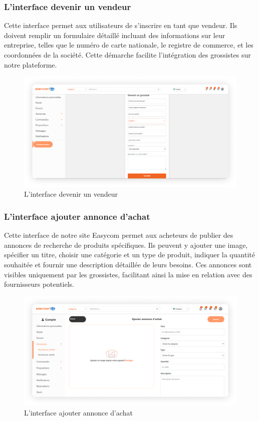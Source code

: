 \documentclass[edit,12pt,a4paper,ChapStyle,oneside,doubleinterligne]{report}
\begin{document}
\subsubsection{L'interface devenir un vendeur}
Cette interface permet aux utilisateurs de s'inscrire en tant que vendeur. Ils doivent remplir un formulaire détaillé incluant des informations sur leur entreprise, telles que le numéro de carte nationale, le registre de commerce, et les coordonnées de la société. Cette démarche facilite l'intégration des grossistes sur notre plateforme.
  \begin{figure} [H]
    \centering
    \includegraphics[width=1\textwidth]{images/devenir grossiste 1.png}
    \caption{L'interface devenir un vendeur}
    \label{fig:Devenir un grossiste}
\end{figure}
\subsubsection{L'interface ajouter annonce d’achat}
Cette interface de notre site Easycom permet aux acheteurs de publier des annonces de recherche de produits spécifiques. Ils peuvent y ajouter une image, spécifier un titre, choisir une catégorie et un type de produit, indiquer la quantité souhaitée et fournir une description détaillée de leurs besoins. Ces annonces sont visibles uniquement par les grossistes, facilitant ainsi la mise en relation avec des fournisseurs potentiels.
  \begin{figure} [H]
    \centering
    \includegraphics[width=1\textwidth]{images/ajouter annonce d'achat.png}
    \caption{L'interface ajouter annonce d’achat}
    \label{fig:Ajouter annonce d’achat}
\end{figure}
\end{document}
